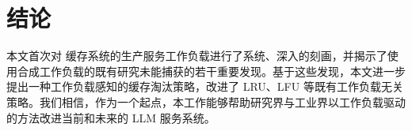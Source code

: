 \section{结论}
本文首次对 {\kvcache} 缓存系统的生产服务工作负载进行了系统、深入的刻画，并揭示了使用合成工作负载的既有研究未能捕获的若干重要发现。基于这些发现，本文进一步提出一种工作负载感知的缓存淘汰策略，改进了 LRU、LFU 等既有工作负载无关策略。我们相信，作为一个起点，本工作能够帮助研究界与工业界以工作负载驱动的方法改进当前和未来的 LLM 服务系统。
